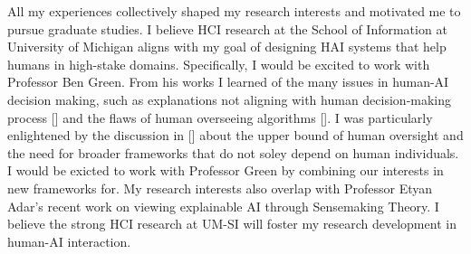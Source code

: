 

All my experiences collectively shaped my research interests and motivated
me to pursue graduate studies. 
I believe HCI research at the School of Information at University of Michigan aligns with my goal of designing HAI systems that help humans in high-stake domains.
Specifically, I would be excited to work with Professor Ben Green. 
From his works I learned of the many issues in human-AI decision making, such as explanations not aligning with human decision-making process [] and the flaws of human overseeing algorithms []. 
I was particularly enlightened by the discussion in [] about the upper bound of human oversight and the need for broader frameworks that do not soley depend on human individuals. I would be exicted to work with Professor Green by combining our interests in new frameworks for.
My research interests also overlap with Professor Etyan Adar's recent work on viewing explainable AI through Sensemaking Theory. 
I believe the strong HCI research at UM-SI will foster my research development in human-AI interaction.




